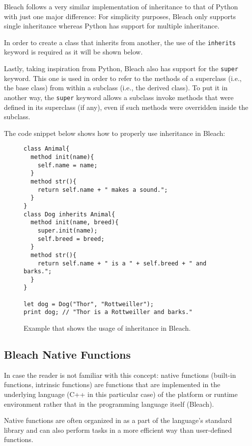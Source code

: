 \begin{itemize}
    Bleach follows a very similar implementation of inheritance to that of Python with just one major difference: For simplicity purposes, Bleach only supports single inheritance whereas Python has support for multiple inheritance.

    In order to create a class that inherits from another, the use of the \texttt{inherits} keyword is required as it will be shown below.

    Lastly, taking inspiration from Python, Bleach also has support for the \texttt{super} keyword. This one is used in order to refer to the methods of a superclass (i.e., the base class) from within a subclass (i.e., the derived class). To put it in another way, the \texttt{super} keyword allows a subclass invoke methods that were defined in its superclass (if any), even if such methods were overridden inside the subclass. 

    The code snippet below shows how to properly use inheritance in Bleach:
\begin{figure}[H]
    \centering
    \begin{lstlisting}
class Animal{
  method init(name){
    self.name = name;
  }
  method str(){
    return self.name + " makes a sound.";
  }
}
class Dog inherits Animal{
  method init(name, breed){
    super.init(name);
    self.breed = breed;
  }
  method str(){
    return self.name + " is a " + self.breed + " and barks.";
  }
}

let dog = Dog("Thor", "Rottweiller");
print dog; // "Thor is a Rottweiller and barks."
    \end{lstlisting}
    \caption{Example that shows the usage of inheritance in Bleach.}
\end{figure}



    
\end{itemize}


\subsection{Bleach Native Functions}
In case the reader is not familiar with this concept: native functions (built-in functions, intrinsic functions) are functions that are implemented in the underlying language (C++ in this particular case) of the platform or runtime environment rather that in the programming language itself (Bleach).

Native functions are often organized in as a part of the language's standard library and can also perform tasks in a more efficient way than user-defined functions.

